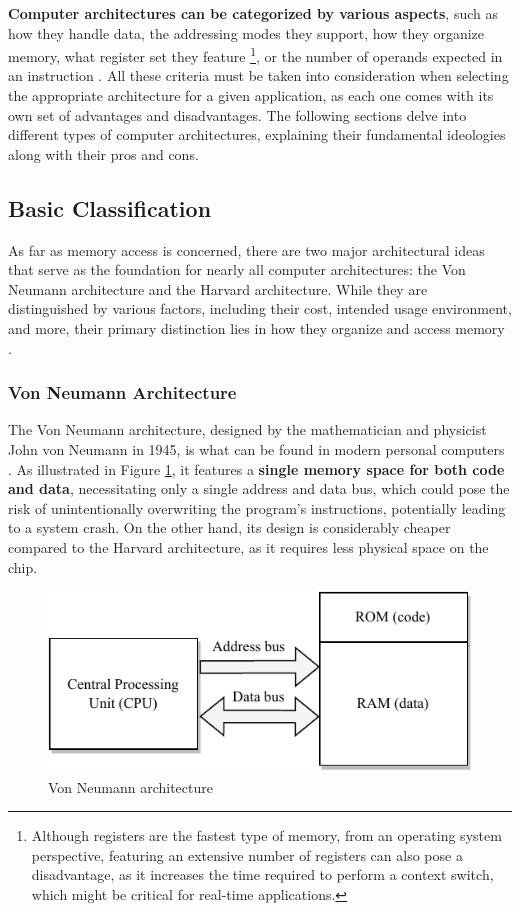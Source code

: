 \documentclass[english, ing, kiv, he, iso690numb, pdf]{fasthesis}
\begin{document}
	\textbf{Computer architectures can be categorized by various aspects}, such as how they handle data, the addressing modes they support, how they organize memory, what register set they feature \footnote{Although registers are the fastest type of memory, from an operating system perspective, featuring an extensive number of registers can also pose a disadvantage, as it increases the time required to perform a context switch, which might be critical for real-time applications.}, or the number of operands expected in an \break instruction \cite{computer-architecture-1}. All these criteria must be taken into consideration when selecting the appropriate architecture for a given application, as each one comes with its own set of advantages and disadvantages. The following sections delve into different types of computer architectures, explaining their fundamental ideologies along with their pros and cons.
	
	\subsection{Basic Classification}
	
	As far as memory access is concerned, there are two major architectural ideas that serve as the foundation for nearly all computer architectures: the Von Neumann architecture and the Harvard architecture. While they are distinguished by various factors, including their cost, intended usage environment, and more, their primary distinction lies in how they organize and access memory \cite{harvard-architecture-1}.
	
	\subsubsection{Von Neumann Architecture}
	
	The Von Neumann architecture, designed by the mathematician and physicist John von Neumann in 1945, is what can be found in modern personal computers \cite{computer-architecture-and-implementation}. As illustrated in Figure \ref{Von Neumann architecture}, it features a \textbf{single memory space for both code and data}, necessitating only a single address and data bus, which could pose the risk of unintentionally overwriting the program's instructions, potentially leading to a system crash. On the other hand, its design is considerably cheaper compared to the Harvard architecture, as it requires less physical space on the chip.
	
	\begin{figure}[ht]
		\centering
		\includegraphics[width=.56\textwidth]{img/diagrams/von_neumann.pdf}
		\caption{Von Neumann architecture}
		\label{Von Neumann architecture}
	\end{figure}
	
\end{document}
